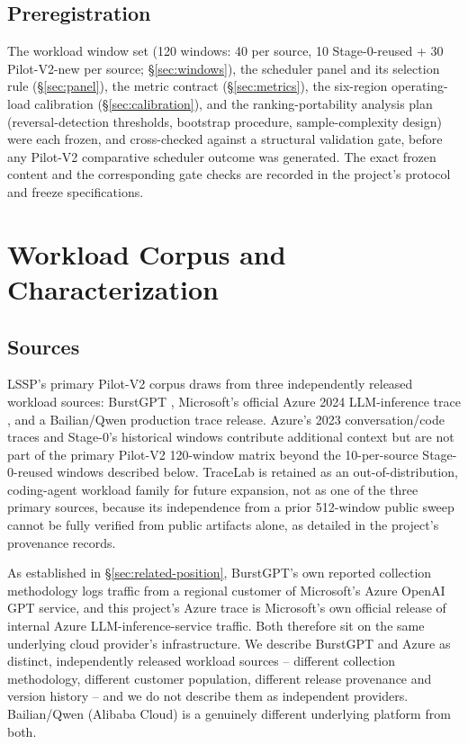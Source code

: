 \documentclass[sn-basic,Numbered,pdflatex]{sn-jnl}
\begin{document}
\subsection{Preregistration}
\label{sec:prereg}

The workload window set (120 windows: 40 per source, 10 Stage-0-reused +
30 Pilot-V2-new per source; \S\ref{sec:windows}), the scheduler panel and
its selection rule (\S\ref{sec:panel}), the metric contract
(\S\ref{sec:metrics}), the six-region operating-load calibration
(\S\ref{sec:calibration}), and the ranking-portability analysis plan
(reversal-detection thresholds, bootstrap procedure, sample-complexity
design) were each frozen, and cross-checked against a structural validation
gate, before any Pilot-V2 comparative scheduler outcome was generated.
The exact frozen content and the corresponding gate checks are recorded in the project's protocol and freeze specifications.

\section{Workload Corpus and Characterization}
\label{sec:workloads}

\subsection{Sources}
\label{sec:sources}

LSSP's primary Pilot-V2 corpus draws from three independently released
workload sources: BurstGPT \citep{burstgpt2025}, Microsoft's official Azure
2024 LLM-inference trace \citep{azure2024trace,stojkovic2025dynamollm}, and a Bailian/Qwen
production trace release. Azure's 2023 conversation/code traces
\citep{patel2024splitwise} and Stage-0's historical windows contribute
additional context but are not part of the primary Pilot-V2 120-window
matrix beyond the 10-per-source Stage-0-reused windows described below.
TraceLab \citep{tracelab2026} is retained as an out-of-distribution,
coding-agent workload family for future expansion, not as one of the three
primary sources, because its independence from a prior 512-window public sweep cannot be fully verified from public artifacts alone, as detailed in the project's provenance records.

As established in \S\ref{sec:related-position}, BurstGPT's own reported
collection methodology logs traffic from a regional customer of Microsoft's
Azure OpenAI GPT service, and this project's Azure trace is Microsoft's own
official release of internal Azure LLM-inference-service traffic. Both
therefore sit on the same underlying cloud provider's infrastructure. We
describe BurstGPT and Azure as distinct, independently released workload
sources -- different collection methodology, different customer
population, different release provenance and version history -- and we do
not describe them as independent providers. Bailian/Qwen (Alibaba Cloud)
is a genuinely different underlying platform from both.
\end{document}
